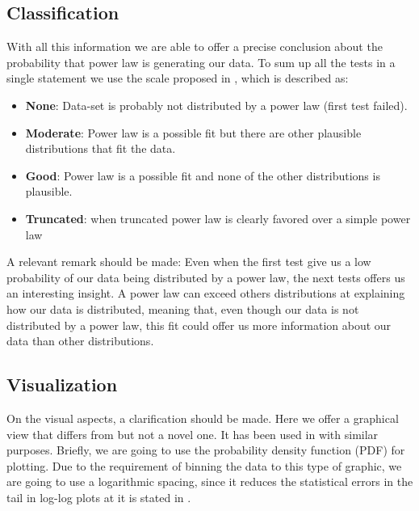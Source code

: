 \documentclass[conference]{IEEEtran}
\begin{document}
\subsection{Classification}

With all this information we are able to offer a precise conclusion
about the probability that power law is generating our data. To sum up
all the tests in a single statement we use the scale proposed in
\cite{clauset2009power}, which is described as:
\begin{itemize}
\item \textbf{None}: Data-set is probably not distributed by a power
  law (first test failed).
\item \textbf{Moderate}: Power law is a possible fit but there are
  other plausible distributions that fit the data.
\item \textbf{Good}: Power law is a possible fit and none of the other
  distributions is plausible.
\item \textbf{Truncated}: when truncated power law is clearly favored
  over a simple power law
\end{itemize}

A relevant remark should be made: Even when the first test give us a
low probability of our data being distributed by a power law, the next
tests offers us an interesting insight. A power law can exceed others
distributions at explaining how our data is distributed, meaning that,
even though our data is not distributed by a power law, this fit could
offer us more information about our data than other distributions.

\subsection{Visualization}
 
On the visual aspects, a clarification should be made. Here we offer a
graphical view that differs from \cite{merelo2017self} but not a novel
one. It has been used in \cite{arafat2009commit} with similar
purposes.  Briefly, we are going to use the probability density
function (PDF) for plotting. Due to the requirement of binning the
data to this type of graphic, we are going to use a logarithmic
spacing, since it reduces the statistical errors in the tail in
log-log plots at it is stated in \cite{newman2005power}.


\end{document}
